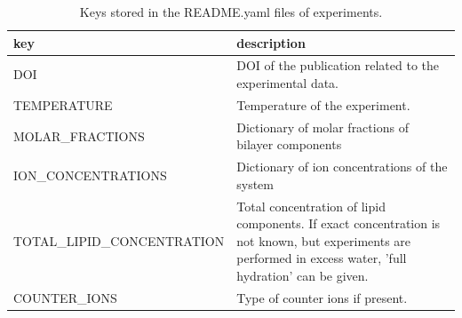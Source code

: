 \documentclass[fleqn,10pt]{wlscirep}
\begin{document}


\begin{table}[h]
    \centering
    \begin{tabular}{  p{5.0cm}  p{10.0cm}}
    \toprule
    key & description \\
    \midrule
    DOI & DOI of the publication related to the experimental data. \\
    TEMPERATURE & Temperature of the experiment. \\
    MOLAR\_FRACTIONS & Dictionary of molar fractions of bilayer components \\
    ION\_CONCENTRATIONS & Dictionary of ion concentrations of the system \\
    TOTAL\_LIPID\_CONCENTRATION & Total concentration of lipid components. If exact concentration is not known, but experiments are performed in excess water, 'full hydration' can be given. \\
    COUNTER\_IONS & Type of counter ions if present.
\end{tabular}
    \caption{Keys stored in the README.yaml files of experiments.}
    \label{tab:READMEkeysEXP}
\end{table}
\end{document}
